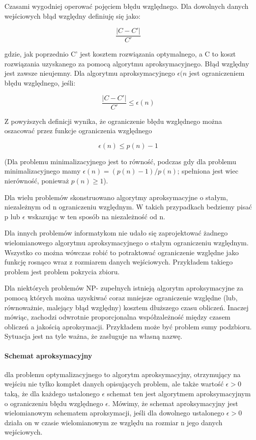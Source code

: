 \documentclass[a4paper,twoside]{report}
\begin{document}
Czasami wygodniej operować pojęciem błędu względnego. Dla dowolnych danych wejściowych błąd względny definiuję się jako:

$$ \frac{|C-C'|}{C'}$$

gdzie, jak poprzednio C' jest kosztem rozwiązania optymalnego, a C to koszt rozwiązania uzyskanego za pomocą algorytmu aproksymacyjnego. Błąd względny jest zawsze nieujemny. Dla algorytmu aproksymacyjnego $\epsilon (n$ jest ograniczeniem błędu względnego, jeśli:

$$ \frac{|C-C'|}{C'} \le \epsilon(n)$$


Z powyższych definicji wynika, że ograniczenie błędu względnego można oszacować przez funkcje ograniczenia względnego

$$ \epsilon (n) \le p(n) -1 $$

(Dla problemu minimalizacyjnego jest to równość, podczas gdy dla problemu minimalizacyjnego mamy $\epsilon (n) = (p(n)-1)/p(n) $; spełniona jest wiec nierówność, ponieważ $ p(n) \ge 1 $).

Dla wielu problemów skonstruowano algorytmy aproksymacyjne o stałym, niezależnym od n ograniczeniu względnym. W takich przypadkach bedziemy pisać p lub $\epsilon$ wskazując w ten sposób na niezależność od n.

Dla innych problemów informatykom nie udało się zaprojektować żadnego wielomianowego algorytmu aproksymacyjnego o stałym ograniczeniu względnym. Wszystko co można wówczas robić to potraktować ograniczenie względne jako funkcję rosnąco wraz z rozmiarem danych wejściowych. Przykładem takiego problem jest problem pokrycia zbioru.

Dla niektórych problemów NP- zupełnych istnieją algorytm aproksymacyjne za pomocą których można uzyskiwać coraz mniejsze ograniczenie względne (lub, równoważnie, malejący błąd względny) kosztem dłuższego czasu obliczeń. Inaczej mówiąc, zachodzi odwrotnie proporcjonalna współzależność między czasem obliczeń a jakością aproksymacji. Przykładem może być problem sumy podzbioru. Sytuacja jest na tyle ważna, że zasługuje na własną nazwę.

\paragraph{Schemat aproksymacyjny} dla problemu optymalizacyjnego to algorytm aproksymacyjny, otrzymujący na wejściu nie tylko komplet danych opisujących problem, ale także wartość $\epsilon > 0$ taką, że dla każdego ustalonego $\epsilon$ schemat ten jest algorytmem aproksymacyjnym o ograniczeniu błędu względnego $\epsilon$. Mówimy, że schemat aproksymacyjny jest wielomianowym schematem aproksymacji, jeśli dla dowolnego ustalonego $\epsilon > 0$ działa on w czasie wielomianowym ze względu na rozmiar n jego danych wejściowych.
\end{document}
